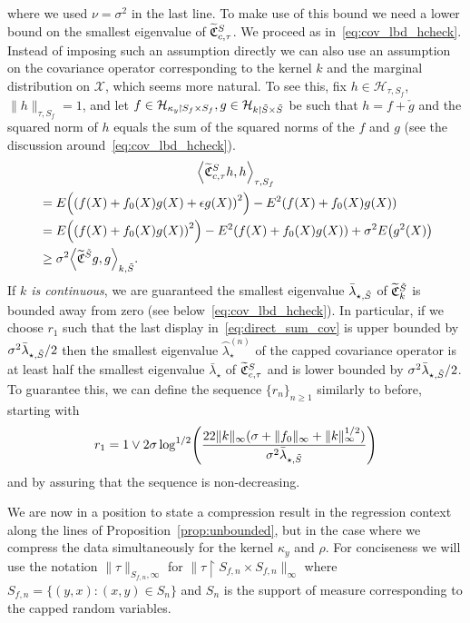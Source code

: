 \documentclass[AHL,Unicode,longabstracts,published]{cedram}
\theoremstyle{remark}
\newcommand{\restrr}
{\!\!\upharpoonright\!\!}
\newcommand{\X}{\mathcal{X}}
\newcommand{\cH}{\mathcal{H}}
\newcommand{\fkC}{\mathfrak{C}}
\newcommand{\Cov}{\tilde{\fkC}}
\newcommand*{\mk}{\mkern -1mu}
\let\oldtilde\tilde
\renewcommand*{\tilde}[1]{\mathchoice{\widetilde{#1}}{\widetilde{#1}}{\oldtilde{#1}}{\oldtilde{#1}}}
\let\originalleft\left
\let\originalright\right
\renewcommand{\left}{\mathopen{}\mathclose\bgroup\originalleft}
\renewcommand{\right}{\aftergroup\egroup\originalright}
\begin{document}
where we used $\nu = \sigma^2$ in the last line. To make use of this bound we need a lower bound on the smallest eigenvalue of $\Cov_{c,\tau}^S$. We proceed as in~\eqref{eq:cov_lbd_hcheck}. Instead of imposing such an assumption directly we can also use an assumption on the covariance operator corresponding to the kernel $k$ and the marginal distribution on $\X$, which seems more natural. To see this, fix $h \in \cH_{\tau,S_f}$, $\|h\|_{\tau,S_f} = 1$, and let $f \in \cH_{\kappa_y\mk\upharpoonright\mk S_f \times S_f}, g \in \cH_{k \mk\upharpoonright\mk \tilde S \times \tilde S}$ be such that $h = f + \check{g}$ and the squared norm of $h$ equals the sum of the squared norms of the $f$ and $g$ (see the discussion around~\eqref{eq:cov_lbd_hcheck}).
\begin{multline*}
\left\langle \Cov_{c,\tau}^S h, h \right\rangle_{\tau,S_f}\\
\begin{aligned}
&= E\left(\left(f(X) + f_0(X) g(X) + \epsilon g(X)\right)^2\right) - E^2(f(X) + f_0(X) g(X)) \\
&= E\left(\left(f(X) + f_0(X) g(X)\right)^2\right) - E^2(f(X) + f_0(X) g(X)) + \sigma^2 E\left(g^2(X)\right) \\
&\geq \sigma^2 \left\langle \Cov^{\tilde S} g, g \right\rangle_{k,\tilde S}.
\end{aligned}
\end{multline*}
If \emph{$k$ is continuous}, we are guaranteed the smallest eigenvalue $\bar \lambda_{\star,\tilde S}$ of $\Cov^{\tilde S}_k$ is bounded away from zero (see below~\eqref{eq:cov_lbd_hcheck}). In particular, if we choose $r_1$ such that the last display in~\eqref{eq:direct_sum_cov} is upper bounded by $ \sigma^2 \bar \lambda_{\star,\tilde S}/ 2$ then the smallest eigenvalue $\wideparen \lambda_{\star}^{(n)}$ of the capped covariance operator is at least half the smallest eigenvalue $\bar \lambda_\star$ of $\Cov_{c,\tau}^S$ and is lower bounded by $\sigma^2 \bar \lambda_{\star,\tilde S}/2$. To guarantee this, we can define the sequence $\{r_n\}_{n\geq 1}$ similarly to before, starting with
\begin{equation}\label{def:r1_regression}
r_1 = 1 \vee 2 \sigma \log^{1/2}\left(\frac{22 \|k\|_\infty (\sigma + \|f_0\|_\infty + \|k\|_\infty^{1/2}) }{\sigma^2 \bar \lambda_{\star,\tilde S}}
\right)
\end{equation}
and by assuring that the sequence is non-decreasing.


We are now in a position to state a compression result in the regression context along the lines of Proposition~\ref{prop:unbounded}, but in the case where we compress the data simultaneously for the kernel $\kappa_y$ and $\rho$. For conciseness we will use the notation $\|\tau\|_{S_{f,n},\infty}$ for $\|\tau \restrr S_{f,n} \times S_{f,n} \|_\infty$ where $S_{f,n} = \{ (y,x) : (x,y) \in S_n\}$ and $S_n$ is the support of measure corresponding to the capped random variables.
\end{document}
